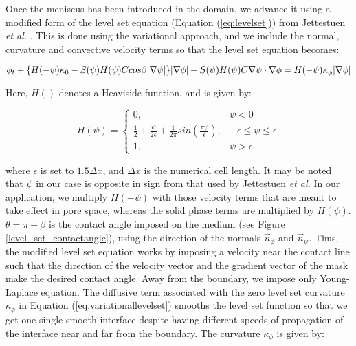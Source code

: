 Once the meniscus has been introduced in the domain, we advance it using a modified form of the level set equation (Equation (\ref{eq:levelset})) from Jettestuen \emph{et al.} \cite{jettestuen_level_2013}. This is done using the variational approach, and we include the normal, curvature and convective velocity terms so that the level set equation becomes:


\begin{equation}
\label{eq:variationallevelset}
\phi_t + \{H(-\psi)\kappa_0 - S(\psi)H(\psi)Ccos\beta|\nabla\psi|\}|\nabla\phi| \\
+S(\psi)H(\psi)C\nabla\psi\cdot\nabla\phi = H(-\psi)\kappa_{\phi}|\nabla\phi|
\end{equation}

Here, $H()$ denotes a Heaviside function, and is given by:

\begin{equation}
H(\psi) = \left\{
	\begin{array}{lr}
		0,  &  \psi < 0 \\
		\frac{1}{2} + \frac{\psi}{2\epsilon} + \frac{1}{2\pi}sin\left(\frac{\pi\psi}{\epsilon}\right), & -\epsilon \le \psi \le \epsilon \\
		1, & \psi> \epsilon
		\end{array}
		\right.
		\label{eq:heaviside}
\end{equation}

where $\epsilon$ is set to $1.5\Delta x$, and $\Delta x$ is the numerical cell length. It may be noted that $\psi$ in our case is opposite in sign from that used by Jettestuen \emph{et al.} In our application, we multiply $H(-\psi)$ with those velocity terms that are meant to take effect in pore space, whereas the solid phase terms are multiplied by $H(\psi)$. $\theta = \pi - \beta$ is the contact angle imposed on the medium (see Figure \ref{level_set_contactangle}), using the direction of the normals $\vec{n}_\phi$ and $\vec{n}_\psi$. Thus, the modified level set equation works by imposing a velocity near the contact line such that the direction of the velocity vector and the gradient vector of the mask make the desired contact angle. Away from the boundary, we impose only Young-Laplace equation. The diffusive term associated with the zero level set curvature $\kappa_\phi$ in Equation (\ref{eq:variationallevelset}) smooths the level set function so that we get one single smooth interface despite having different speeds of propagation of the interface near and far from the boundary. The curvature $\kappa_\phi$ is given by:


